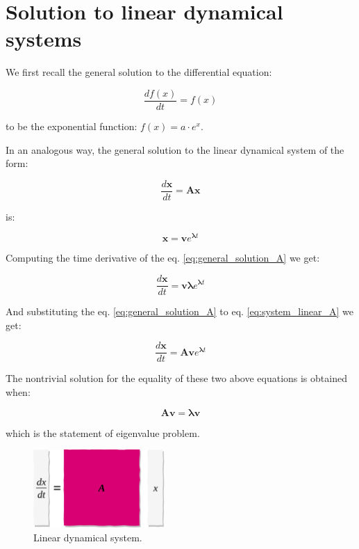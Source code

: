 \documentclass[10pt,twocolumn]{article}
\begin{document}
\section{Solution to linear dynamical systems} \label{app:A}

We first recall the general solution to the differential equation:

\begin{equation} \label{eq:DE_exp}
\frac{d f(x)}{dt} = f(x)
\end{equation}

to be the exponential function: $f(x) = a \cdot e^{x}$.


In an analogous way, the general solution to the linear dynamical system of the form:

\begin{equation} \label{eq:system_linear_A}
\frac{d \mathbf{x}}{dt} = \mathbf{A} \mathbf{x}
\end{equation}

is:

\begin{equation} \label{eq:general_solution_A}
\mathbf{x} = \mathbf{v} e^{\mathbf{\lambda} t}
\end{equation}

Computing the time derivative of the eq. \ref{eq:general_solution_A} we get:

\begin{equation} \label{eq:sub1}
\frac{d \mathbf{x}}{dt} = \mathbf{v} \mathbf{\lambda} e^{\mathbf{\lambda} t}
\end{equation}

And substituting the eq. \ref{eq:general_solution_A} to eq. \ref{eq:system_linear_A} we get:

\begin{equation} \label{eq:sub2}
\frac{d \mathbf{x}}{dt} = \mathbf{A} \mathbf{v} e^{\mathbf{\lambda} t}
\end{equation}

The nontrivial solution for the equality of these two above equations is obtained when:

\begin{equation} \label{eq:eigval}
\mathbf{A} \mathbf{v} = \mathbf{\lambda} \mathbf{v} 
\end{equation}

which is the statement of eigenvalue problem.



\begin{figure}[H]
\centering\includegraphics[width=5cm]{lin-dyn.png}
\caption{Linear dynamical system.}
\label{fig:linear_system}
\end{figure}
\end{document}
